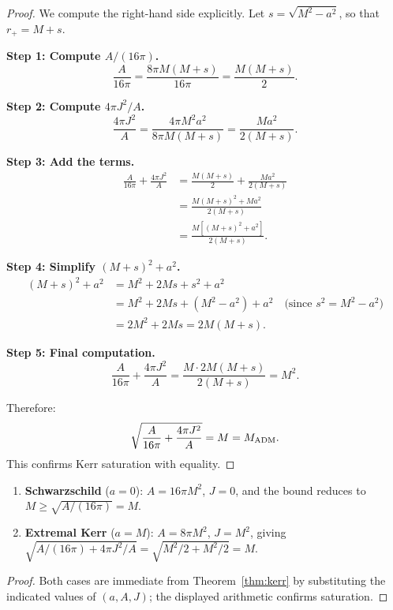 \begin{proof}
We compute the right-hand side explicitly. Let $s = \sqrt{M^2 - a^2}$, so that $r_+ = M + s$.

\textbf{Step 1: Compute $A/(16\pi)$.}
\[
\frac{A}{16\pi} = \frac{8\pi M(M + s)}{16\pi} = \frac{M(M + s)}{2}.
\]

\textbf{Step 2: Compute $4\pi J^2/A$.}
\[
\frac{4\pi J^2}{A} = \frac{4\pi M^2 a^2}{8\pi M(M + s)} = \frac{Ma^2}{2(M + s)}.
\]

\textbf{Step 3: Add the terms.}
\begin{align}
\frac{A}{16\pi} + \frac{4\pi J^2}{A} &= \frac{M(M + s)}{2} + \frac{Ma^2}{2(M + s)} \\
&= \frac{M(M + s)^2 + Ma^2}{2(M + s)} \\
&= \frac{M[(M + s)^2 + a^2]}{2(M + s)}.
\end{align}

\textbf{Step 4: Simplify $(M + s)^2 + a^2$.}
\begin{align}
(M + s)^2 + a^2 &= M^2 + 2Ms + s^2 + a^2 \\
&= M^2 + 2Ms + (M^2 - a^2) + a^2 \quad \text{(since } s^2 = M^2 - a^2\text{)} \\
&= 2M^2 + 2Ms = 2M(M + s).
\end{align}

\textbf{Step 5: Final computation.}
\[
\frac{A}{16\pi} + \frac{4\pi J^2}{A} = \frac{M \cdot 2M(M + s)}{2(M + s)} = M^2.
\]

Therefore:
\[
\sqrt{\frac{A}{16\pi} + \frac{4\pi J^2}{A}} = M = M_{\mathrm{ADM}}.
\]
This confirms Kerr saturation with equality.
\end{proof}

\begin{corollary}\leavevmode
\begin{enumerate}[label=(\arabic*)]
    \item \textbf{Schwarzschild} ($a = 0$): $A = 16\pi M^2$, $J = 0$, and the bound reduces to $M \geq \sqrt{A/(16\pi)} = M$. \checkmark
    \item \textbf{Extremal Kerr} ($a = M$): $A = 8\pi M^2$, $J = M^2$, giving $\sqrt{A/(16\pi) + 4\pi J^2/A} = \sqrt{M^2/2 + M^2/2} = M$. \checkmark
\end{enumerate}
\end{corollary}
\begin{proof}
Both cases are immediate from Theorem~\ref{thm:kerr} by substituting the indicated values of $(a, A, J)$; the displayed arithmetic confirms saturation.
\end{proof}

